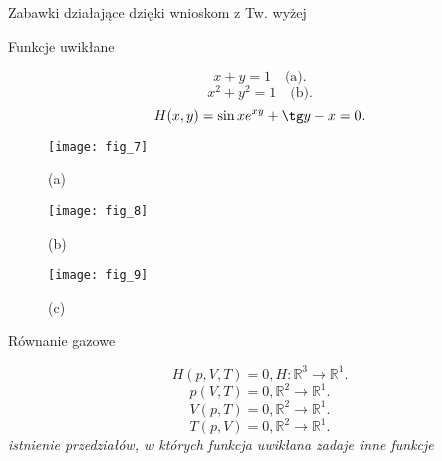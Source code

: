\documentclass[../main.tex]{subfiles}
\begin{document}
\begin{large}
    Zabawki działające dzięki wnioskom z Tw. wyżej
\end{large}

\begin{definicja}
    Funkcje uwikłane
\end{definicja}
\[
    x+y=1 \quad\text{(a)}
.\]
\[
    x^2+y^2=1 \quad\text{(b)}
.\]
\[
    H(x,y) = \sin x e^{xy}+ \tg y - x = 0
.\]


\vspace{2cm}

\begin{figure}
    \centering
    \texttt{[image: fig\_7]}
    \caption{(a)}
\end{figure}
\begin{figure}
    \centering
    \texttt{[image: fig\_8]}
    \caption{(b)}
\end{figure}
\begin{figure}
    \centering
    \texttt{[image: fig\_9]}
    \caption{(c)}
\end{figure}


\vspace{1cm}

\begin{przyklad}
    Równanie gazowe
\end{przyklad}
    \[
        H(p,V,T) = 0, H: \mathbb{R}^{3} \to \mathbb{R}^{1}
    .\]
    \[
        p(V,T) = 0, \mathbb{R}^{2}\to\mathbb{R}^{1}
    .\]
    \[
        V(p,T) = 0, \mathbb{R}^{2}\to\mathbb{R}^{1}
    .\]
    \[
        T(p,V) = 0, \mathbb{R}^{2}\to\mathbb{R}^{1}
    .\]
    \textit{istnienie przedziałów, w których funkcja uwikłana zadaje inne funkcje}
\end{document}
